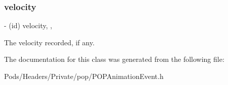 \subsubsection{\texorpdfstring{velocity}{velocity}}
{\footnotesize\ttfamily -\/ (id) velocity\hspace{0.3cm}{\ttfamily [read]}, {\ttfamily [nonatomic]}, {\ttfamily [strong]}}

The velocity recorded, if any. 

The documentation for this class was generated from the following file\+:\begin{DoxyCompactItemize}
\item 
Pods/\+Headers/\+Private/pop/P\+O\+P\+Animation\+Event.\+h\end{DoxyCompactItemize}
